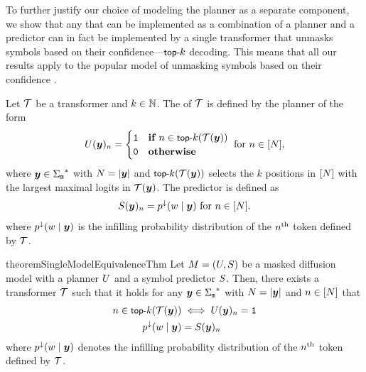 To further justify our choice of modeling the planner as a separate component, we show that any \MDMAcr that can be implemented as a combination of a planner and a predictor can in fact be implemented by a single transformer that unmasks symbols based on their confidence---${{\textnormal{{\small \textsf{top-}}}k}}$ decoding.
This means that all our results apply to the popular model of unmasking symbols based on their confidence \citep{ghazvininejad-etal-2019-mask,peng2025pathplanningmaskeddiffusion,zheng2024reparameterizeddiscretediffusionmodel,liu2025thinkgeneratediscretediffusion,kim2025trainworstplanbest,benhamu2025acceleratedsamplingmaskeddiffusion}.
\begin{definition}
   Let ${{\mathcal{T}}}$ be a transformer and $k \in {{\mathbb{N}}}$. 
   The  of ${{\mathcal{T}}}$ is defined by the planner of the form 
   \begin{equation}
      \planner(\unmstr)_\stridx = 
      \begin{cases}
         \acceptSym & \ifcondition \stridx \in \topkFun{\tf(\unmstr)} \\
         \rejectSym & \otherwisecondition
      \end{cases}
      \text{ for } \stridx \in \NTo{\strlen},
   \end{equation}
   where ${{\boldsymbol{y}}} \in {{{{{\Sigma}}_{{\texttt{m}}}}^{*}}}$ with ${{N}} = |{{\boldsymbol{y}}}|$ and $\topkFun{\tf(\unmstr)}$ selects the $k$ positions in ${\left[ {{N}} \right]}$ with the largest maximal logits in ${{\mathcal{T}}}({{\boldsymbol{y}}})$.
   The predictor is defined as
   \begin{equation}
      {S}({{\boldsymbol{y}}})_{{n}} = {{{{p}}^{\downarrow}}({{w}} \mid {{\boldsymbol{y}}})}
      \text{ for } {{n}} \in {\left[ {{N}}\right]}.
   \end{equation}
   where ${{{{p}}^{\downarrow}}({{w}} \mid {{\boldsymbol{y}}})}$ is the infilling probability distribution of the ${{n}}\textsuperscript{th}$ token defined by ${{\mathcal{T}}}$.
\end{definition}
\begin{restatable}{theorem}{SingleModelEquivalenceThm} \label{thm:single-model-equivalence}
   Let ${M} = ({U}, {S})$ be a masked diffusion model with a planner ${U}$ and a symbol predictor ${S}$.
   Then, there exists a transformer ${{\mathcal{T}}}$ such that it holds for any ${{\boldsymbol{y}}} \in {{{{{\Sigma}}_{{\texttt{m}}}}^{*}}}$ with ${{N}} = |{{\boldsymbol{y}}}|$ and ${{n}} \in {\left[ {{N}}\right]}$ that
   \begin{subequations}
      \begin{align}
         \stridx \in \topkFun{\tf(\unmstr)} &\iff \planner(\unmstr)_\stridx = \acceptSym \\
         \pLMInfFun{\sym \mid \unmstr} &= \predictor(\unmstr)_{\stridx}
      \end{align}
   \end{subequations}
   where ${{{{p}}^{\downarrow}}({{w}} \mid {{\boldsymbol{y}}})}$ denotes the infilling probability distribution of the ${{n}}\textsuperscript{th}$ token defined by ${{\mathcal{T}}}$.
\end{restatable}
